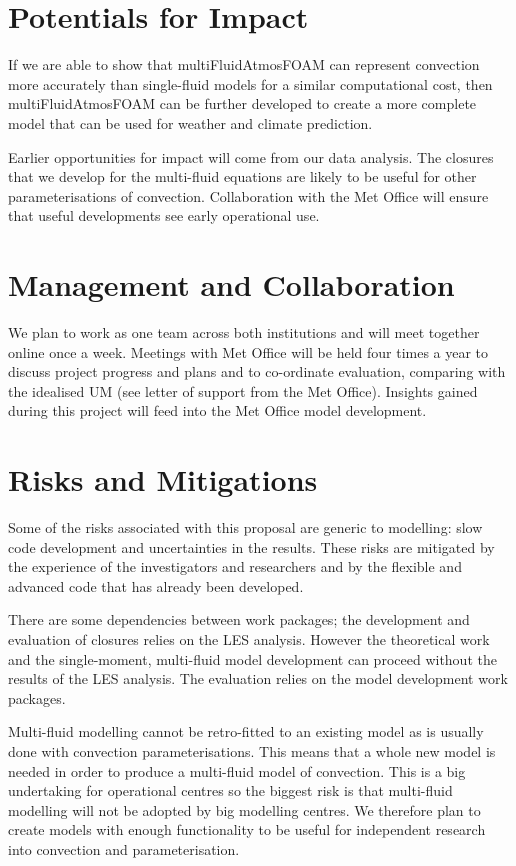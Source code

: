 \documentclass[11pt,a4paper]{article}
\begin{document}
\section{Potentials for Impact}

If we are able to show that multiFluidAtmosFOAM can represent convection more accurately than single-fluid models for a similar computational cost, then multiFluidAtmosFOAM can be further developed to create a more complete model that can be used for weather and climate prediction.

Earlier opportunities for impact will come from our data analysis. The closures that we develop for the multi-fluid equations are likely to be useful for other parameterisations of convection. Collaboration with the Met Office will ensure that useful developments see early operational use. 

\section{Management and Collaboration}

We plan to work as one team across both institutions and will meet together online once a week. Meetings with Met Office will be held four times a year to discuss project progress and plans and to co-ordinate evaluation, comparing with the idealised UM (see letter of support from the Met Office). Insights gained during this project will feed into the Met Office model development.

\section{Risks and Mitigations}

Some of the risks associated with this proposal are generic to modelling: slow code development and uncertainties in the results. These risks are mitigated by the experience of the investigators and researchers and by the flexible and advanced code that has already been developed.

There are some dependencies between work packages; the development and evaluation of closures relies on the LES analysis. However the theoretical work and the single-moment, multi-fluid model development can proceed without the results of the LES analysis. The evaluation relies on the model development work packages.

Multi-fluid modelling cannot be retro-fitted to an existing model as is usually done with convection parameterisations. This means that a whole new model is needed in order to produce a multi-fluid model of convection. This is a big undertaking for operational centres so the biggest risk is that multi-fluid modelling will not be adopted by big modelling centres. We therefore plan to create models with enough functionality to be useful for independent research into convection and parameterisation.

\renewcommand\refname{References (not included in Track Record)}

%

\end{document}
